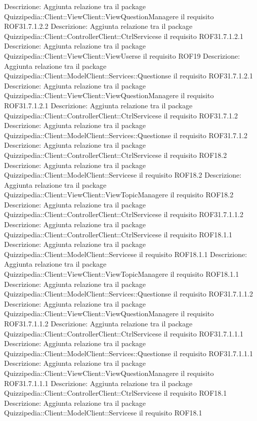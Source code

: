Descrizione: Aggiunta relazione tra il package Quizzipedia::Client::ViewClient::ViewQuestionManagere il requisito ROF31.7.1.2.2 
Descrizione: Aggiunta relazione tra il package Quizzipedia::Client::ControllerClient::CtrlServicese il requisito ROF31.7.1.2.1 
Descrizione: Aggiunta relazione tra il package Quizzipedia::Client::ViewClient::ViewUserse il requisito ROF19 
Descrizione: Aggiunta relazione tra il package Quizzipedia::Client::ModelClient::Services::Questionse il requisito ROF31.7.1.2.1 
Descrizione: Aggiunta relazione tra il package Quizzipedia::Client::ViewClient::ViewQuestionManagere il requisito ROF31.7.1.2.1 
Descrizione: Aggiunta relazione tra il package Quizzipedia::Client::ControllerClient::CtrlServicese il requisito ROF31.7.1.2 
Descrizione: Aggiunta relazione tra il package Quizzipedia::Client::ModelClient::Services::Questionse il requisito ROF31.7.1.2 
Descrizione: Aggiunta relazione tra il package Quizzipedia::Client::ControllerClient::CtrlServicese il requisito ROF18.2 
Descrizione: Aggiunta relazione tra il package Quizzipedia::Client::ModelClient::Servicese il requisito ROF18.2 
Descrizione: Aggiunta relazione tra il package Quizzipedia::Client::ViewClient::ViewTopicManagere il requisito ROF18.2 
Descrizione: Aggiunta relazione tra il package Quizzipedia::Client::ControllerClient::CtrlServicese il requisito ROF31.7.1.1.2 
Descrizione: Aggiunta relazione tra il package Quizzipedia::Client::ControllerClient::CtrlServicese il requisito ROF18.1.1 
Descrizione: Aggiunta relazione tra il package Quizzipedia::Client::ModelClient::Servicese il requisito ROF18.1.1 
Descrizione: Aggiunta relazione tra il package Quizzipedia::Client::ViewClient::ViewTopicManagere il requisito ROF18.1.1 
Descrizione: Aggiunta relazione tra il package Quizzipedia::Client::ModelClient::Services::Questionse il requisito ROF31.7.1.1.2 
Descrizione: Aggiunta relazione tra il package Quizzipedia::Client::ViewClient::ViewQuestionManagere il requisito ROF31.7.1.1.2 
Descrizione: Aggiunta relazione tra il package Quizzipedia::Client::ControllerClient::CtrlServicese il requisito ROF31.7.1.1.1 
Descrizione: Aggiunta relazione tra il package Quizzipedia::Client::ModelClient::Services::Questionse il requisito ROF31.7.1.1.1 
Descrizione: Aggiunta relazione tra il package Quizzipedia::Client::ViewClient::ViewQuestionManagere il requisito ROF31.7.1.1.1 
Descrizione: Aggiunta relazione tra il package Quizzipedia::Client::ControllerClient::CtrlServicese il requisito ROF18.1 
Descrizione: Aggiunta relazione tra il package Quizzipedia::Client::ModelClient::Servicese il requisito ROF18.1 
